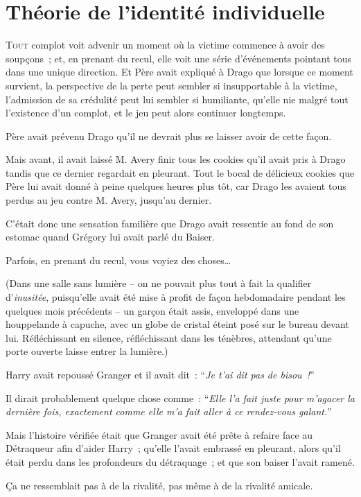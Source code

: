 \chapter{Théorie de l'identité individuelle}

\lettrine{T}{out} complot voit advenir un moment où la victime commence à avoir des soupçons~; et, en prenant du recul, elle voit une série d'événements pointant tous dans une unique direction. Et Père avait expliqué à Drago que lorsque ce moment survient, la perspective de la perte peut sembler si insupportable à la victime, l'admission de sa crédulité peut lui sembler si humiliante, qu'elle nie malgré tout l'existence d'un complot, et le jeu peut alors continuer longtemps.

Père avait prévenu Drago qu'il ne devrait plus se laisser avoir de cette façon.

Mais avant, il avait laissé M. Avery finir tous les cookies qu'il avait pris à Drago tandis que ce dernier regardait en pleurant. Tout le bocal de délicieux cookies que Père lui avait donné à peine quelques heures plus tôt, car Drago les avaient tous perdus au jeu contre M. Avery, jusqu'au dernier.

C'était donc une sensation familière que Drago avait ressentie au fond de son estomac quand Grégory lui avait parlé du Baiser.

Parfois, en prenant du recul, vous voyiez des choses…

(Dans une salle sans lumière -- on ne pouvait plus tout à fait la qualifier d'\emph{inusitée}, puisqu'elle avait été mise à profit de façon hebdomadaire pendant les quelques mois précédents -- un garçon était assis, enveloppé dans une houppelande à capuche, avec un globe de cristal éteint posé sur le bureau devant lui. Réfléchissant en silence, réfléchissant dans les ténèbres, attendant qu'une porte ouverte laisse entrer la lumière.)

Harry avait repoussé Granger et il avait dit~: “\emph{Je t'ai dit pas de bisou~!}”

Il dirait probablement quelque chose comme~: “\emph{Elle l'a fait juste pour m'agacer la dernière fois, exactement comme elle m'a fait aller à ce rendez-vous galant.}”

Mais l'histoire vérifiée était que Granger avait été prête à refaire face au Détraqueur afin d'aider Harry~; qu'elle l'avait embrassé en pleurant, alors qu'il était perdu dans les profondeurs du détraquage~; et que son baiser l'avait ramené.

Ça ne ressemblait pas à de la rivalité, pas même à de la rivalité amicale.

